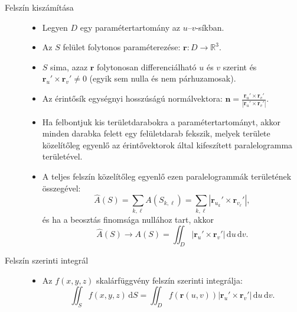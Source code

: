 \documentclass[DIV=15,appendixprefix]{scrreprt}
\theoremstyle{definition}
\theoremstyle{remark}
\begin{document}
\begin{description}
	\item[Felszín kiszámítása]\leavevmode
		\begin{itemize}
			\item Legyen $ D $ egy paramétertartomány az $ u $--$ v $-síkban.
			\item Az $ S $ felület folytonos paraméterezése: $ \mathbf{ r } \colon D \rightarrow
			 	\mathbb{ R }^{ 3 }$.
			\item $ S $ sima, azaz $ \mathbf{ r } $ folytonosan differenciálható $ u$  és $ v $
				szerint és $ \mathbf{ r }_{ u }' \times \mathbf{r}_{ v }' \neq 0 $ (egyik sem nulla
				és nem párhuzamosak).
			\item Az érintősík egységnyi hosszúságú normálvektora: $ \mathbf{ n } =
				\frac{ \mathbf{ r }_{ u }' \times \mathbf{ r }_{ v }' }{ \left| \mathbf{ r }_{ u }'
				\times \mathbf{ r }_{ v }' \right|}$.
			\item Ha felbontjuk kis területdarabokra a paramétertartományt, akkor minden darabka
				felett egy felületdarab fekszik, melyek területe közelítőleg egyenlő az
				érintővektorok által kifeszített paralelogramma területével.
			\item A teljes felszín közelítőleg egyenlő ezen paralelogrammák területének összegével:
				\begin{equation*}
					\hat{ A } \left( S \right) = \sum_{ k,{} \ell} A \left( S_{ k,{} \ell } \right)
					= \sum_{ k,{} \ell} \left| \mathbf{r}_{ u_{ k } }' \times
					\mathbf{r}_{ v_{ \ell } }'\right|,
				\end{equation*}
				és ha a beosztás finomsága nullához tart, akkor
				\begin{equation*}
					\hat{ A } \left( S \right) \rightarrow A \left( S \right) = \iint_{ D } \left|
					\mathbf{r}_{ u }' \times \mathbf{r}_{ v }'\right| \, \mathrm{ d } u \,
					\mathrm{ d } v.
				\end{equation*}
		\end{itemize}
	\item[Felszín szerinti integrál]\leavevmode
		\begin{itemize}
			\item Az $ f \left( x,{} y,{} z \right) $ skalárfüggvény felszín szerinti integrálja:
				\begin{equation*}
					\iint_{ S } f \left( x,{} y,{} z \right) \, \mathrm{ d } S = \iint_{ D } f
					\left( \mathbf{ r } \left( u,{} v \right) \right) \left| \mathbf{r}_{ u }'
					\times \mathbf{r}_{ v }'\right| \, \mathrm{ d } u \, \mathrm{ d } v.

\end{equation*}
\end{itemize}
\end{description}
\end{document}
